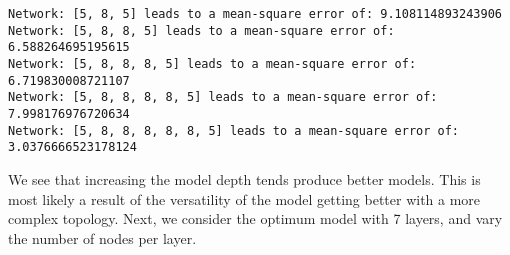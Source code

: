 \documentclass[11pt]{article}
\begin{document}
    \begin{Verbatim}[commandchars=\\\{\}]
Network: [5, 8, 5] leads to a mean-square error of: 9.108114893243906
Network: [5, 8, 8, 5] leads to a mean-square error of: 6.588264695195615
Network: [5, 8, 8, 8, 5] leads to a mean-square error of: 6.719830008721107
Network: [5, 8, 8, 8, 8, 5] leads to a mean-square error of: 7.998176976720634
Network: [5, 8, 8, 8, 8, 8, 5] leads to a mean-square error of: 3.0376666523178124

    \end{Verbatim}

    We see that increasing the model depth tends produce better models. This
is most likely a result of the versatility of the model getting better
with a more complex topology. Next, we consider the optimum model with 7
layers, and vary the number of nodes per layer.
\end{document}
